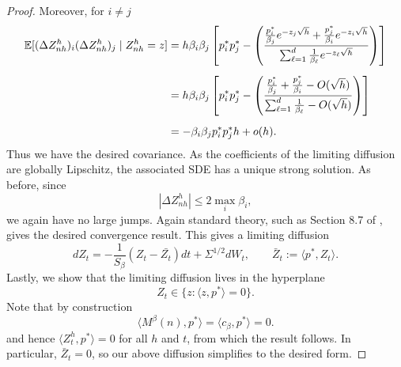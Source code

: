 \begin{subappendices}
\begin{proof}
\noindent Moreover, for $i \neq j$
%
\begin{align*}
     \mathbb{E} [(\Delta Z_{nh}^h)_i (\Delta Z_{nh}^h)_j \mid Z_{nh}^h = z  ] & = h \beta_i \beta_j\left[p_i^*p_j^* -  \left(\frac{\frac{p_i^*}{\beta_j}e^{- z_j \sqrt{h}} + \frac{p_j^*}{\beta_i}e^{-  z_i \sqrt{h}}}{\sum_{\ell = 1}^d \frac{1}{ \beta_\ell}e^{- z_\ell\sqrt{h}}}\right)\right] \\[5pt]
     & = h \beta_i \beta_j\left[p_i^*p_j^* - \left(\frac{\frac{p_i^*}{\beta_j} + \frac{p_j^*}{\beta_i}-O(\sqrt{h})}{\sum_{\ell=1}^d \frac{1}{\beta_\ell}-O(\sqrt{h})}\right)\right]\\[5pt]
     & = - \beta_i \beta_j p_i^*p_j^*h + o(h).
\end{align*}
%
\noindent Thus we have the desired covariance. As the coefficients of the limiting diffusion are globally Lipschitz, the associated SDE has a unique strong 
solution. As before, since
%
    \[|\Delta Z^h_{nh}| \leq 2\max_i \beta_i,\]
%
\noindent we again have no large jumps. Again standard theory, such as Section 8.7 of \cite{durrett1996_stochastic_calculus_practical_introduction}, gives the desired convergence result. 
This gives a limiting diffusion
%
\[dZ_t = -\frac{1}{S_\beta}(Z_t - \bar{Z_t}) dt + \Sigma^{1/2} dW_t, \qquad \bar{Z}_t := \langle p^*, Z_t \rangle.\]
%
\noindent Lastly, we show that the limiting diffusion lives in the hyperplane
%
\[Z_t \in \{z : \langle z, p^* \rangle = 0\}.\]
%
\noindent Note that by construction
%
\[\langle M^\beta(n), p^*\rangle = \langle c_\beta, p^* \rangle = 0.\]
%
\noindent and hence $\langle Z^h_t, p^*\rangle = 0$ for all $h$ and $t$, from which the result follows. In particular, $\bar{Z}_t = 0$, so our above diffusion simplifies to the desired form.
\end{proof}


\end{subappendices}
